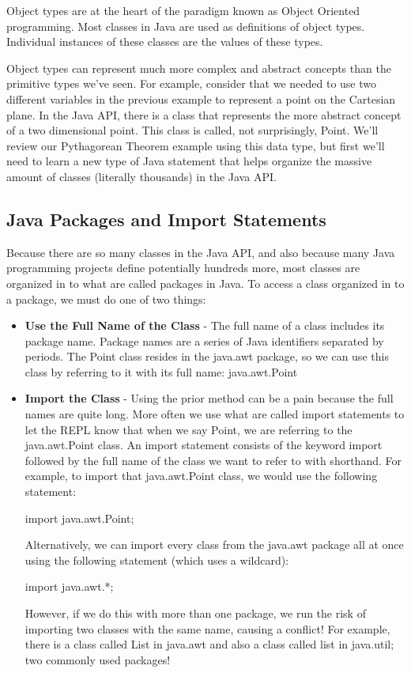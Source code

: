 Object types are at the heart of the paradigm known as Object Oriented programming. Most classes in Java are used as definitions of object types. Individual instances of these classes are the values of these types. 

Object types can represent much more complex and abstract concepts than the primitive types we've seen. For example, consider that we needed to use two different variables in the previous example to represent a point on the Cartesian plane. In the Java API, there is a class that represents the more abstract concept of a two dimensional point. This class is called, not surprisingly, Point. We'll review our Pythagorean Theorem example using this data type, but first we'll need to learn a new type of Java statement that helps organize the massive amount of classes (literally thousands) in the Java API. 

\subsection{Java Packages and Import Statements}

Because there are so many classes in the Java API, and also because many Java programming projects define potentially hundreds more, most classes are organized in to what are called packages in Java. To access a class organized in to a package, we must do one of two things:

\begin{itemize}
\item \textbf{Use the Full Name of the Class} - The full name of a class includes its package name. Package names are a series of Java identifiers separated by periods. The Point class resides in the java.awt package, so we can use this class by referring to it with its full name: java.awt.Point
\item \textbf{Import the Class} - Using the prior method can be a pain because the full names are quite long. More often we use what are called import statements to let the REPL know that when we say Point, we are referring to the java.awt.Point class. An import statement consists of the keyword import followed by the full name of the class we want to refer to with shorthand. For example, to import that java.awt.Point class, we would use the following statement:

\begin{code}
import java.awt.Point;
\end{code}

Alternatively, we can import every class from the java.awt package all at once using the following statement (which uses a wildcard):

\begin{code}
import java.awt.*;
\end{code}

However, if we do this with more than one package, we run the risk of importing two classes with the same name, causing a conflict! For example, there is a class called List in java.awt and also a class called list in java.util; two commonly used packages!
\end{itemize}

